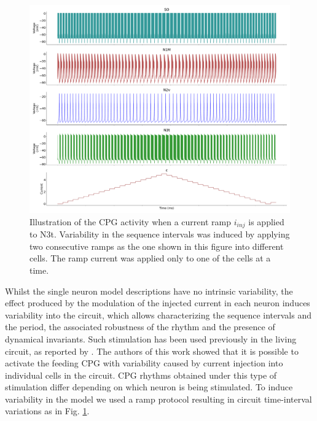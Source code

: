\begin{figure}[hbt!]
	\centering
	\includegraphics[width=\textwidth]{img/methods-paper-modelo/circuit_w_current.pdf}
	\caption{Illustration of the CPG activity when a current ramp \(i_{inj}\) is applied to N3t. Variability in the sequence intervals was induced by applying two consecutive ramps as the one shown in this figure into different cells. The ramp current was applied only to one of the cells at a time.}
	\label{fig:complete ramp example}
\end{figure}

Whilst the single neuron model descriptions have no intrinsic variability, the effect produced by the modulation of the injected current in each neuron induces variability into the circuit, which allows characterizing the sequence intervals and the period, the associated robustness of the rhythm and the presence of dynamical invariants. Such stimulation has been used previously in the living circuit, as reported by \textcite{elliott_temporal_1991}. The authors of this work showed that it is possible to activate the feeding CPG with variability caused by current injection into individual cells in the circuit. CPG rhythms obtained under this type of stimulation differ depending on which neuron is being stimulated. To induce variability in the model we used a ramp protocol resulting in circuit time-interval variations as in Fig. \ref{fig:complete ramp example}.



